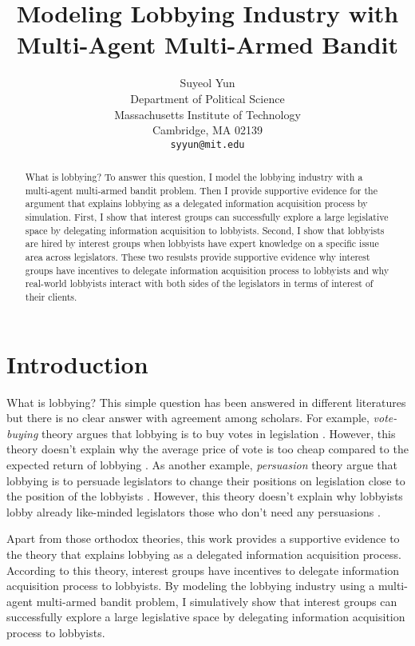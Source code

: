 \documentclass{article}
\title{Modeling 
Lobbying Industry with Multi-Agent Multi-Armed Bandit}
\author{%
Suyeol Yun
\\
Department of Political Science\\
Massachusetts Institute of Technology\\
Cambridge, MA 02139 \\
\texttt{syyun@mit.edu} \\
}
\begin{document}
\maketitle
\begin{abstract}
What is lobbying?
To answer this question, 
I model the lobbying industry 
with a multi-agent multi-armed bandit problem.
Then I provide supportive evidence 
for the argument 
that explains lobbying 
as a delegated information acquisition process by simulation.
First, I show that 
interest groups can successfully explore 
a large legislative space
by delegating information acquisition to lobbyists.
Second, I show that 
lobbyists are hired by interest groups
when lobbyists have 
expert knowledge on a specific issue area 
across legislators.
These two resulsts  
provide supportive evidence
why interest groups 
have incentives to delegate information acquisition process to lobbyists
and why real-world lobbyists interact with both sides of the legislators in terms of interest of their clients.
\end{abstract}

\section{Introduction}
What is lobbying? 
This simple question has been answered in different literatures 
\citep{hall_deardorff_2006, 10.2307/43495360, 10.2307/3216842}
but there is no clear answer with agreement among scholars.
For example, \textit{vote-buying} theory argues 
that lobbying is to buy votes in legislation \citep{grossman}. 
However, this theory doesn't explain 
why the average price of vote is too cheap compared 
to the expected return of lobbying \citep{10.2307/3216842}.
As another example, \textit{persuasion} 
theory argue that lobbying is to persuade 
legislators to change their positions on legislation close to 
the position of the lobbyists
\citep{truman, Bauer2017, milbrath1984washington}.
However, this theory doesn't 
explain why lobbyists lobby 
already like-minded legislators 
those who don't need any persuasions \citep{10.2307/2586303}.

Apart from those orthodox theories,
this work 
provides a supportive evidence 
to the theory 
that explains lobbying as a 
delegated information acquisition process.
According to this theory, interest groups 
have incentives to delegate information acquisition process to lobbyists.
By modeling the lobbying industry 
using a multi-agent multi-armed bandit problem,
I simulatively show that
interest groups can successfully explore 
a large legislative space by delegating information acquisition process to lobbyists.
\end{document}
